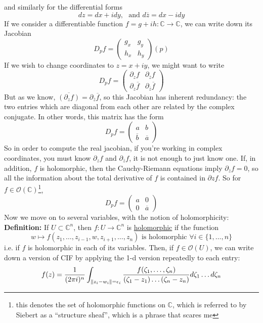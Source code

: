 \documentclass[12pt]{report}
\theoremstyle{definition}
\theoremstyle{remark}
\numberwithin{equation}{section}
\theoremstyle{definition}
\newcommand{\bb}[1]{\mathbb{#1}}
\DeclarePairedDelimiter\norm{\lVert}{\rVert}%
\begin{document}
and similarly for the differential forms
$$
	dz = dx + i dy, \ \ \ \text{and   } d \overline z = dx -i dy 
$$
If we consider a differentiable function $f = g+ih: \bb C \to \bb C$, we can write down its Jacobian 
$$
	D_p f = \begin{pmatrix} g_x & g_y \\ h_x & h_y \end{pmatrix}(p)
$$
If we wish to change coordinates to $z = x + iy$, we might want to write
$$
	D_p f = \begin{pmatrix} \partial_z f & \partial_{\overline z} f \\ \partial_z \overline f & \partial_{\overline z} \overline f \end{pmatrix}
$$
But as we know, $\overline{(\partial_z f)} = \partial_{\overline z} \overline f$, so this Jacobian has inherent redundancy: the two entries which are diagonal from each other are related by the complex conjugate. In other words, this matrix has the form 
$$
	D_p f = \begin{pmatrix} a & b \\ \overline b & \overline a\end{pmatrix}
$$
So in order to compute the real jacobian, if you're working in complex coordinates, you must know $\partial_z f$ and $\partial _{\overline z}f$, it is not enough to just know one. If, in addition, $f$ is holomorphic, then the Cauchy-Riemann equations imply $\partial_{\overline z} f = 0$, so all the information about the total derivative of $f$ is contained in $\partial z f$. So for $f \in \mathcal{O}(\bb C)$\footnote{this denotes the set of holomorphic functions on $\bb C$, which is referred to by Siebert as a ``structure sheaf'', which is a phrase that scares me}, 
$$
	D_p f = \begin{pmatrix} a & 0 \\ 0 & \overline a \end{pmatrix}
$$
Now we move on to several variables, with the notion of holomorphicity:\\
\textbf{Definition: }If $U \subset \bb C^n$, then $f: U \to \bb C^n$ is \underline{holomorphic} if the function 
$$
	w \mapsto f(z_1, \dots, z_{i-1}, w, z_{i+1}, \dots, z_n) \text{  is holomorphic  } \forall i \in \{1, \dots, n\}
$$
i.e. if $f$ is holomorphic in each of its variables. Then, if $f \in \mathcal{O}(U)$, we can write down a version of CIF by applying the 1-d version repeatedly to each entry:
$$
	f(z) = \frac{1}{(2\pi i)^n}\int_{\norm{z_i - w_i} = \epsilon_i} \frac{f(\zeta_1,\dots,\zeta_n)}{(\zeta_1-z_1)\dots(\zeta_n-z_n)}d\zeta_1\dots d\zeta_n
$$
\end{document}
